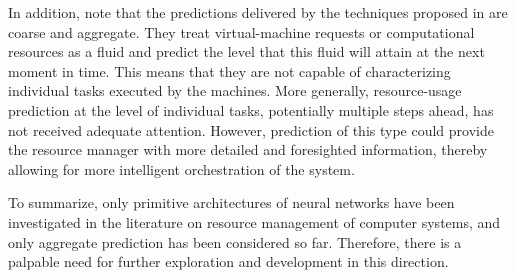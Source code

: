 In addition, note that the predictions delivered by the techniques proposed in
\cite{cao2014, dabbagh2015, ismaeel2015} are coarse and aggregate. They treat
virtual-machine requests or computational resources as a fluid and predict the
level that this fluid will attain at the next moment in time. This means that
they are not capable of characterizing individual tasks executed by the
machines. More generally, resource-usage prediction at the level of individual
tasks, potentially multiple steps ahead, has not received adequate attention.
However, prediction of this type could provide the resource manager with more
detailed and foresighted information, thereby allowing for more intelligent
orchestration of the system.

To summarize, only primitive architectures of neural networks have been
investigated in the literature on resource management of computer systems, and
only aggregate prediction has been considered so far. Therefore, there is a
palpable need for further exploration and development in this direction.
